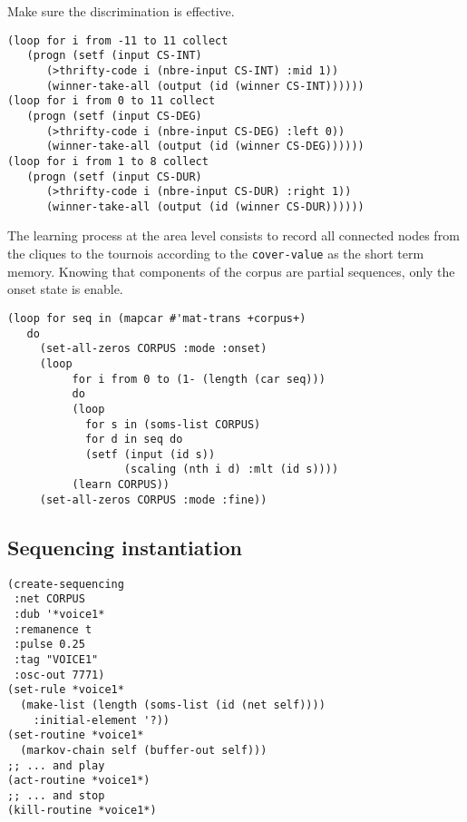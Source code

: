 Make sure the discrimination is effective. 
\begin{lstlisting}[language=N3]
(loop for i from -11 to 11 collect 
   (progn (setf (input CS-INT) 
      (>thrifty-code i (nbre-input CS-INT) :mid 1)) 
      (winner-take-all (output (id (winner CS-INT))))))
(loop for i from 0 to 11 collect 
   (progn (setf (input CS-DEG) 
      (>thrifty-code i (nbre-input CS-DEG) :left 0)) 
      (winner-take-all (output (id (winner CS-DEG))))))
(loop for i from 1 to 8 collect 
   (progn (setf (input CS-DUR) 
      (>thrifty-code i (nbre-input CS-DUR) :right 1)) 
      (winner-take-all (output (id (winner CS-DUR))))))
\end{lstlisting}
The learning process at the area level consists to record all connected nodes from the cliques to the tournois according to the \texttt{cover-value} as the short term memory. Knowing that components of the corpus are partial sequences, only the onset state is enable.
\begin{lstlisting}[language=N3]
(loop for seq in (mapcar #'mat-trans +corpus+)
   do     
     (set-all-zeros CORPUS :mode :onset)  
     (loop
	      for i from 0 to (1- (length (car seq))) 
	      do
	      (loop
	        for s in (soms-list CORPUS)
	        for d in seq do
	        (setf (input (id s)) 
	              (scaling (nth i d) :mlt (id s))))
	      (learn CORPUS))
     (set-all-zeros CORPUS :mode :fine))
\end{lstlisting}

\subsection{Sequencing instantiation}

\begin{lstlisting}[language=N3]
(create-sequencing
 :net CORPUS
 :dub '*voice1*
 :remanence t
 :pulse 0.25
 :tag "VOICE1"
 :osc-out 7771)
(set-rule *voice1* 
  (make-list (length (soms-list (id (net self)))) 
    :initial-element '?))
(set-routine *voice1* 
  (markov-chain self (buffer-out self)))
;; ... and play
(act-routine *voice1*)
;; ... and stop
(kill-routine *voice1*)
\end{lstlisting}
